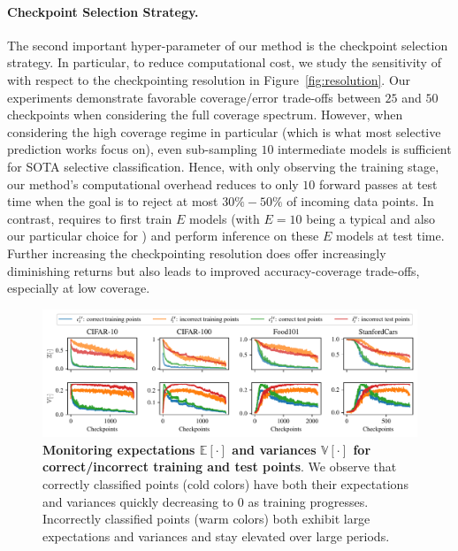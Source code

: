\paragraph{Checkpoint Selection Strategy.} The second important hyper-parameter of our method is the checkpoint selection strategy. In particular, to reduce computational cost, we study the sensitivity of \sptd with respect to the checkpointing resolution in Figure~\ref{fig:resolution}. Our experiments demonstrate favorable coverage/error trade-offs between $25$ and $50$ checkpoints when considering the full coverage spectrum. However, when considering the high coverage regime in particular (which is what most selective prediction works focus on), even sub-sampling $10$ intermediate models is sufficient for SOTA selective classification. Hence, with only observing the training stage, our method's computational overhead reduces to only $10$ forward passes at test time when the goal is to reject at most $30\%-50\%$ of incoming data points. In contrast, \de requires to first train $E$ models (with $E=10$ being a typical and also our particular choice for \de) and perform inference on these $E$ models at test time. %
Further increasing the checkpointing resolution does offer increasingly diminishing returns but also leads to improved accuracy-coverage trade-offs, especially at low coverage.

\begin{figure}[t]
  \centering
  \includegraphics[width=\linewidth]{figs/sptd/et_vt_updated.pdf}
\caption[Monitoring expectations and variances for correct/incorrect training and test points.]{\textbf{Monitoring expectations $\mathbb{E}[\cdot]$ and variances $\mathbb{V}[\cdot]$ for correct/incorrect training and test points}. We observe that correctly classified points (cold colors) have both their expectations and variances quickly decreasing to 0 as training progresses. Incorrectly classified points (warm colors) both exhibit large expectations and variances and stay elevated over large periods.}
\label{fig:exp_var_trends}
\end{figure}


